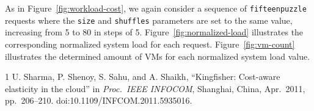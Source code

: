 \documentclass[conference]{IEEEtran}
\begin{document}
As in Figure~\ref{fig:workload-cost}, we again consider a sequence of
\texttt{fifteenpuzzle} requests where the \texttt{size} and \texttt{shuffles}
parameters are set to the same value, increasing from 5 to 80 in steps of 5.
Figure~\ref{fig:normalized-load} illustrates the corresponding normalized system
load for each request. Figure~\ref{fig:vm-count} illustrates the determined
amount of VMs for each normalized system load value.

\begin{thebibliography}{1}
U. Sharma, P. Shenoy, S. Sahu, and A. Shaikh,
``Kingfisher: Cost-aware elasticity in the cloud'' in
\emph{Proc.\ IEEE INFOCOM}, Shanghai, China, Apr.\ 2011, pp.\ 206–210.
doi:10.1109/INFCOM.2011.5935016.

\end{thebibliography}
\end{document}
